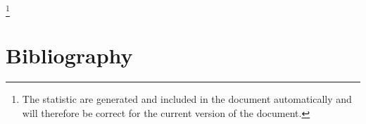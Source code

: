 \footnote{The statistic are generated and included in the document automatically and will therefore be correct for the current version of the document.}

\pagebreak

\section*{Bibliography}\label{BIBLIOGRAPHY}

{\def\section*#1{\ignore{#1}}
\raggedright


} %

{
{\small\printindex}}


